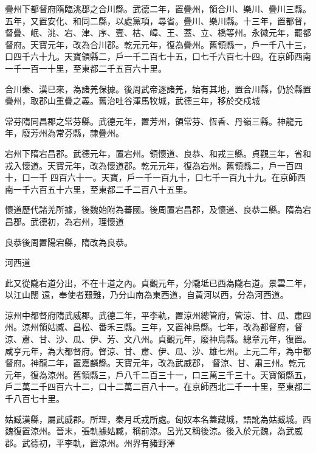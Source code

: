 \begin{pinyinscope}
 疊州下都督府隋臨洮郡之合川縣。武德二年，置疊州，領合川、樂川、疊川三縣。五年，又置安化、和同二縣，以處黨項，尋省。疊川、樂川縣。十三年，置都督，督疊、岷、洮、宕、津、序、壹、枯、嶂、王、蓋、立、橋等州。永徽元年，罷都督府。天寶元年，改為合川郡。乾元元年，復為疊州。舊領縣一，戶一千八十三，口四千六十九。天寶領縣二，戶一千二百七十五，口七千六百七十四。在京師西南一千一百一十里，至東都二千五百六十里。



 合川秦、漢已來，為諸羌保據。後周武帝逐諸羌，始有其地，置合川縣，仍於縣置疊州，取郡山重疊之義。舊治吐谷渾馬牧城，武德三年，移於交戍城



 常芬隋同昌郡之常芬縣。武德元年，置芳州，領常芬、恆香、丹嶺三縣。神龍元年，廢芳州為常芬縣，隸疊州。



 宕州下隋宕昌郡。武德元年，置宕州。領懷道、良恭、和戎三縣。貞觀三年，省和戎入懷道。天寶元年，改為懷道郡。乾元元年，復為宕州。舊領縣二，戶一百四十，口一千
 四百六十一。天寶，戶一千一百九十，口七千一百九十九。在京師西南一千六百五十六里，至東都二千二百八十五里。



 懷道歷代諸羌所據，後魏始附為蕃國。後周置宕昌郡，及懷道、良恭二縣。隋為宕昌郡。武德初，為宕州，理懷道



 良恭後周置陽宕縣，隋改為良恭。



 河西道



 此又從隴右道分出，不在十道之內。貞觀元年，分隴坻已西為隴右道。景雲二年，以江山闊
 遠，奉使者艱難，乃分山南為東西道，自黃河以西，分為河西道。



 涼州中都督府隋武威郡。武德二年，平李軌，置涼州總管府，管涼、甘、瓜、肅四州。涼州領姑臧、昌松、番禾三縣。三年，又置神烏縣。七年，改為都督府，督涼、肅、甘、沙、瓜、伊、芳、文八州。貞觀元年，廢神烏縣。總章元年，復置。咸亨元年，為大都督府。督涼、甘、肅、伊、瓜、沙、雄七州。上元二年，為中都督府。神龍二年，置嘉麟縣。天寶元年，改為武威郡，
 督涼、甘、肅三州。乾元元年，復為涼州。舊領縣三，戶八千二百三十一，口三萬三千三十。天寶領縣五，戶二萬二千四百六十二，口十二萬二百八十一。在京師西北二千一十里，至東都二千八百七十里。



 姑臧漢縣，屬武威郡。所理，秦月氐戎所處。匈奴本名蓋藏城，語訛為姑臧城。西魏復置涼州。晉末，張軌據姑臧，稱前涼。呂光又稱後涼。後入於元魏，為武威郡。武德初，平李軌，置涼州。州界有豬野澤




\end{pinyinscope}
